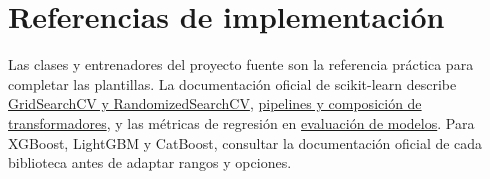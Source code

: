 \documentclass[11pt,a4paper]{article}
\begin{document}
\section{Referencias de implementación}
Las clases y entrenadores del proyecto fuente son la referencia práctica para completar las plantillas. La documentación oficial de scikit-learn describe \href{https://scikit-learn.org/stable/modules/grid_search.html}{GridSearchCV y RandomizedSearchCV}, \href{https://scikit-learn.org/stable/modules/compose.html}{pipelines y composición de transformadores}, y las métricas de regresión en \href{https://scikit-learn.org/stable/modules/model_evaluation.html}{evaluación de modelos}. Para XGBoost, LightGBM y CatBoost, consultar la documentación oficial de cada biblioteca antes de adaptar rangos y opciones.
\end{document}
